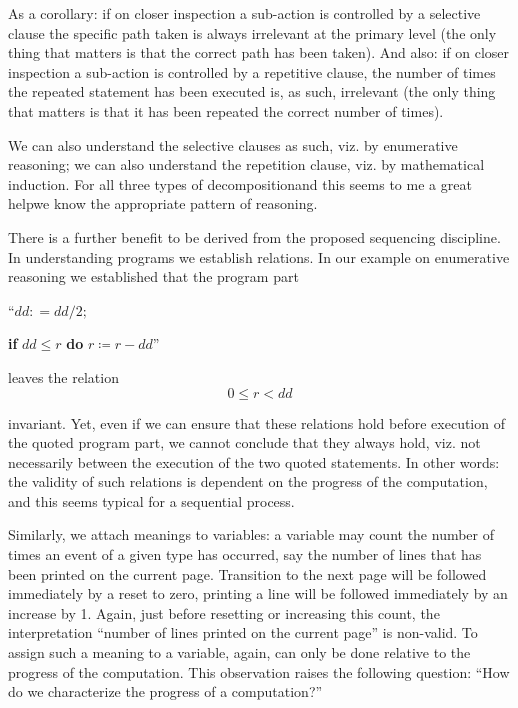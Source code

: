 \documentclass[twoside,11pt]{book}
\begin{document}
As a corollary: if on closer inspection a sub-action is controlled by a selective clause the specific path taken is always irrelevant at the primary level (the only thing that matters is that the correct path has been taken). And also: if on closer inspection a sub-action is controlled by a repetitive clause, the number of times the repeated statement has been executed is, as such, irrelevant (the only thing that matters is that it has been repeated the correct number of times).

We can also understand the selective clauses as such, viz. by enumerative reasoning; we can also understand the repetition clause, viz. by mathematical induction. For all three types of decomposition\textemdash{}and this seems to me a great help\textemdash{}we know the appropriate pattern of reasoning.

There is a further benefit to be derived from the proposed sequencing discipline. In understanding programs we establish relations. In our example on enumerative reasoning we established that the program part
\medskip

{
	\setlength{\parindent}{8em}
	\hspace{-.4em}``$dd: = dd/2;$
	
	\textbf{if} $dd \leqslant r$ \textbf{do} $r \coloneq r - dd$''
}
\medskip

\noindent
leaves the relation
$$
0 \leqslant r < dd
$$

\noindent
invariant. Yet, even if we can ensure that these relations hold before execution of the quoted program part, we cannot conclude that they always hold, viz. not necessarily between the execution of the two quoted statements. In other words: the validity of such relations is dependent on the progress of the computation, and this seems typical for a sequential process.

Similarly, we attach meanings to variables: a variable may count the number of times an event of a given type has occurred, say the number of lines that has been printed on the current page. Transition to the next page will be followed immediately by a reset to zero, printing a line will be followed immediately by an increase by 1. Again, just before resetting or increasing this count, the interpretation ``number of lines printed on the current page'' is non-valid. To assign such a meaning to a variable, again, can only be done relative to the progress of the computation. This observation raises the following question: ``How do we characterize the progress of a computation?''
\end{document}
